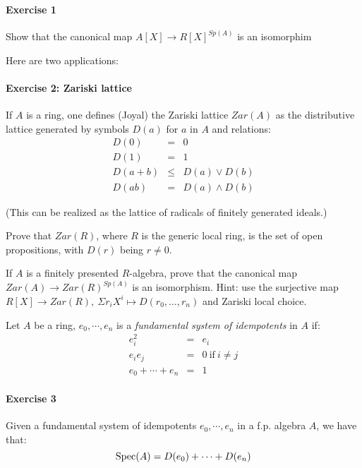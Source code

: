 \paragraph{Exercise 1}{
Show that the canonical map $A[X]\rightarrow R[X]^{Sp(A)}$ is an isomorphim
}

\medskip

 Here are two applications:

\medskip

\paragraph{Exercise 2: {\bf Zariski lattice}}{

If $A$ is a ring, one defines (Joyal) the Zariski lattice $Zar(A)$ as the distributive lattice generated
by symbols $D(a)$ for $a$ in $A$ and relations:
\begin{eqnarray}
D(0) &=& 0 \nonumber\\
D(1) &=& 1 \nonumber\\
D(a+b) &\leq& D(a)\vee D(b)\nonumber\\
D(ab) &=& D(a)\wedge D(b) \nonumber
\end{eqnarray}

(This can be realized as the lattice of radicals of finitely generated ideals.)

Prove that $Zar(R)$, where $R$ is the generic local ring, is the set of open propositions, with $D(r)$ being
$r\neq 0$.

\medskip

If $A$ is a finitely presented $R$-algebra, prove that the canonical map $Zar(A)\rightarrow Zar(R)^{Sp(A)}$
is an isomorphism. Hint: use the surjective map $R[X]\rightarrow Zar(R),~\Sigma r_iX^i\mapsto D(r_0,\dots,r_n)$
and Zariski local choice.

}


\medskip

\begin{definition}
Let $A$ be a ring, $e_0,\cdots,e_n$ is a \emph{fundamental system of idempotents} in $A$ if:
\begin{eqnarray}
e_i^2 &=&e_i\nonumber\\
e_ie_j &=& 0\ \mathrm{if}\ i\not=j\nonumber\\
e_0+\cdots+e_n &=& 1\nonumber
\end{eqnarray}
\end{definition}

\paragraph{Exercise 3}{
Given a fundamental system of idempotents $e_0,\cdots,e_n$ in a f.p. algebra $A$, we have that:
\[\operatorname{Spec}(A) = D(e_0) + \cdots + D(e_n)\]
}

